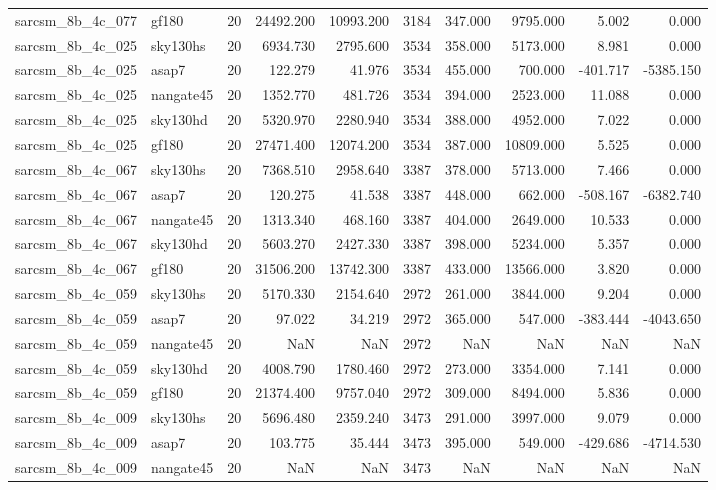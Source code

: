\documentclass{article}
\begin{document}
\begin{longtable}{llrrrrrrrr}
sarcsm\_8b\_4c\_077 & gf180 & 20 & 24492.200 & 10993.200 & 3184 & 347.000 & 9795.000 & 5.002 & 0.000 \\
sarcsm\_8b\_4c\_025 & sky130hs & 20 & 6934.730 & 2795.600 & 3534 & 358.000 & 5173.000 & 8.981 & 0.000 \\
sarcsm\_8b\_4c\_025 & asap7 & 20 & 122.279 & 41.976 & 3534 & 455.000 & 700.000 & -401.717 & -5385.150 \\
sarcsm\_8b\_4c\_025 & nangate45 & 20 & 1352.770 & 481.726 & 3534 & 394.000 & 2523.000 & 11.088 & 0.000 \\
sarcsm\_8b\_4c\_025 & sky130hd & 20 & 5320.970 & 2280.940 & 3534 & 388.000 & 4952.000 & 7.022 & 0.000 \\
sarcsm\_8b\_4c\_025 & gf180 & 20 & 27471.400 & 12074.200 & 3534 & 387.000 & 10809.000 & 5.525 & 0.000 \\
sarcsm\_8b\_4c\_067 & sky130hs & 20 & 7368.510 & 2958.640 & 3387 & 378.000 & 5713.000 & 7.466 & 0.000 \\
sarcsm\_8b\_4c\_067 & asap7 & 20 & 120.275 & 41.538 & 3387 & 448.000 & 662.000 & -508.167 & -6382.740 \\
sarcsm\_8b\_4c\_067 & nangate45 & 20 & 1313.340 & 468.160 & 3387 & 404.000 & 2649.000 & 10.533 & 0.000 \\
sarcsm\_8b\_4c\_067 & sky130hd & 20 & 5603.270 & 2427.330 & 3387 & 398.000 & 5234.000 & 5.357 & 0.000 \\
sarcsm\_8b\_4c\_067 & gf180 & 20 & 31506.200 & 13742.300 & 3387 & 433.000 & 13566.000 & 3.820 & 0.000 \\
sarcsm\_8b\_4c\_059 & sky130hs & 20 & 5170.330 & 2154.640 & 2972 & 261.000 & 3844.000 & 9.204 & 0.000 \\
sarcsm\_8b\_4c\_059 & asap7 & 20 & 97.022 & 34.219 & 2972 & 365.000 & 547.000 & -383.444 & -4043.650 \\
sarcsm\_8b\_4c\_059 & nangate45 & 20 & NaN & NaN & 2972 & NaN & NaN & NaN & NaN \\
sarcsm\_8b\_4c\_059 & sky130hd & 20 & 4008.790 & 1780.460 & 2972 & 273.000 & 3354.000 & 7.141 & 0.000 \\
sarcsm\_8b\_4c\_059 & gf180 & 20 & 21374.400 & 9757.040 & 2972 & 309.000 & 8494.000 & 5.836 & 0.000 \\
sarcsm\_8b\_4c\_009 & sky130hs & 20 & 5696.480 & 2359.240 & 3473 & 291.000 & 3997.000 & 9.079 & 0.000 \\
sarcsm\_8b\_4c\_009 & asap7 & 20 & 103.775 & 35.444 & 3473 & 395.000 & 549.000 & -429.686 & -4714.530 \\
sarcsm\_8b\_4c\_009 & nangate45 & 20 & NaN & NaN & 3473 & NaN & NaN & NaN & NaN \\

\end{longtable}
\end{document}
